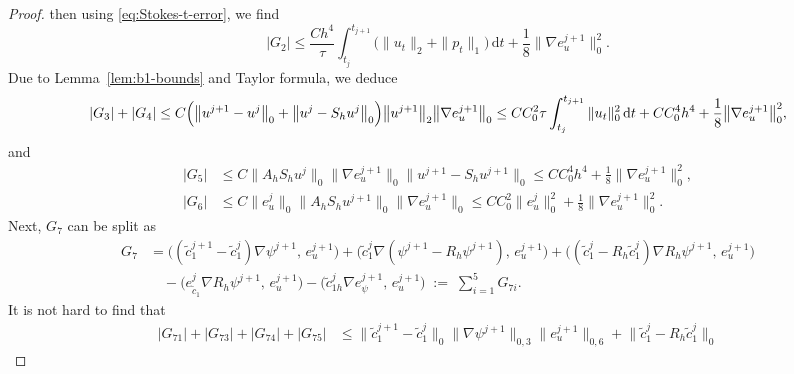 \documentclass[a4paper,fleqn]{cas-sc}
\numberwithin{equation}{section}
\theoremstyle{definition}
\begin{document}
\begin{proof}
then using \eqref{eq:Stokes-t-error}, we find
\begin{equation}\label{eq:4.24}
  |G_{2}| \leq \frac{Ch^{4}}{\tau}\int_{t_{j}}^{t_{j+1}}
               \bigl(\|u_{t}\|_{2} + \|p_{t}\|_{1}\bigr)\,\mathrm{d}t
             + \frac{1}{8}\bigl\|\nabla e_{u}^{j+1}\bigr\|_{0}^{2}.
\end{equation}
Due to Lemma~\ref{lem:b1-bounds} and Taylor formula, we deduce
\begin{equation}\label{eq:4.25}
  |G_{3}| + |G_{4}|
  \leq C\Bigl(\bigl\|u^{j+1}-u^{j}\bigr\|_{0} + \bigl\|u^{j} - S_{h}u^{j}\bigr\|_{0}\Bigr)
        \bigl\|u^{j+1}\bigr\|_{2}\bigl\|\nabla e_{u}^{j+1}\bigr\|_{0}
  \leq CC_{0}^{2}\tau\int_{t_{j}}^{t_{j+1}}\|u_{t}\|_{0}^{2}\,\mathrm{d}t
     + CC_{0}^{4}h^{4}
     + \frac{1}{8}\bigl\|\nabla e_{u}^{j+1}\bigr\|_{0}^{2},
\end{equation}
and
\begin{align}
  |G_{5}| &\leq C\|A_{h}S_{h}u^{j}\|_{0}\bigl\|\nabla e_{u}^{j+1}\bigr\|_{0}
                  \bigl\|u^{j+1} - S_{h}u^{j+1}\bigr\|_{0}
           \leq CC_{0}^{4}h^{4} + \frac{1}{8}\bigl\|\nabla e_{u}^{j+1}\bigr\|_{0}^{2},
  \label{eq:4.26}\\[4pt]
  |G_{6}| &\leq C\bigl\|e_{u}^{j}\bigr\|_{0}\|A_{h}S_{h}u^{j+1}\|_{0}
                  \bigl\|\nabla e_{u}^{j+1}\bigr\|_{0}
           \leq CC_{0}^{2}\bigl\|e_{u}^{j}\bigr\|_{0}^{2}
              + \frac{1}{8}\bigl\|\nabla e_{u}^{j+1}\bigr\|_{0}^{2}.
  \label{eq:4.27}
\end{align}
Next, $G_{7}$ can be split as
\begin{align}
  G_{7} &= \bigl((\tilde{c}_{1}^{j+1} - \tilde{c}_{1}^{j})\nabla\psi^{j+1},\, e_{u}^{j+1}\bigr)
          + \bigl(\tilde{c}_{1}^{j}\nabla(\psi^{j+1} - R_{h}\psi^{j+1}),\, e_{u}^{j+1}\bigr)
          + \bigl((\tilde{c}_{1}^{j} - R_{h}\tilde{c}_{1}^{j})\nabla R_{h}\psi^{j+1},\, e_{u}^{j+1}\bigr)
  \nonumber\\
  &\quad - \bigl(e_{\tilde{c}_{1}}^{j}\nabla R_{h}\psi^{j+1},\, e_{u}^{j+1}\bigr)
          - \bigl(\tilde{c}_{1h}^{j}\nabla e_{\psi}^{j+1},\, e_{u}^{j+1}\bigr)
         \;:=\; \sum_{i=1}^{5}G_{7i}.
  \label{eq:4.28}
\end{align}
It is not hard to find that
\begin{align}
  |G_{71}| + |G_{73}| + |G_{74}| + |G_{75}|
  &\leq \bigl\|\tilde{c}_{1}^{j+1} - \tilde{c}_{1}^{j}\bigr\|_{0}
         \bigl\|\nabla\psi^{j+1}\bigr\|_{0,3}\bigl\|e_{u}^{j+1}\bigr\|_{0,6}
       + \bigl\|\tilde{c}_{1}^{j} - R_{h}\tilde{c}_{1}^{j}\bigr\|_{0}

\end{align}
\end{proof}
\end{document}
